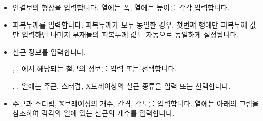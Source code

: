 \documentclass[a4paper,11pt,korean,openany,oneside]{sphinxmanual}
\begin{document}
\begin{itemize}
\begin{description}
\begin{sphinxadmonition}{warning}{경고:}
\sphinxAtStartPar
같은 이름의 연결보가 여러개 있는 경우, 연결보마다 길이가 다를 수 있습니다.
합니다.
다른 길이의 연결보는 이 후의 시트에서 고려하여 입력할 것입니다.
\end{sphinxadmonition}

\end{description}

\item {} \begin{description}
\sphinxAtStartPar
연결보의 형상을 입력합니다. 열에는 폭, 열에는 높이를 각각 입력합니다.

\end{description}

\item {} \begin{description}
\sphinxAtStartPar
피복두께를 입력합니다. 피복두께가 모두 동일한 경우, 첫번쨰 행에만 피복두께 값만 입력하면 나머지 부재들의 피복두께 값도 자동으로 동일하게 설정됩니다.

\end{description}

\item {} \begin{description}
\sphinxAtStartPar
철근 정보를 입력합니다.

\sphinxAtStartPar
{}, , 에서 해당되는 철근의 정보를 입력 또는 선택합니다.

\sphinxAtStartPar
{}, ,  열에는 주근, 스터럽, X\sphinxhyphen{}브레이싱의 철근 종류을 입력 또는 선택합니다.

\end{description}

\item {} \begin{description}
\sphinxAtStartPar
주근과 스터럽, X\sphinxhyphen{}브레이싱의 개수, 간격, 각도를 입력합니다.
 열에는 아래의 그림을 참조하여 각각의 열에 있는 철근의 개수를 입력합니다.


\end{description}
\end{itemize}
\end{document}
